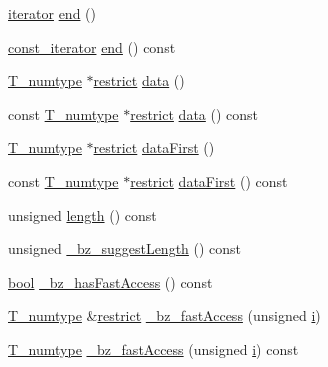 \begin{DoxyCompactItemize}
\item 
\hyperlink{classTinyVector_a7e1e065c0b894add536ab278dfe28202}{iterator} \hyperlink{classTinyVector_affa6a71dd63c4c6d2150bf62dcd23ad1}{end} ()
\item 
\hyperlink{classTinyVector_a58fc9319708794276cdad6399cf03eed}{const\+\_\+iterator} \hyperlink{classTinyVector_a276faa465ad7117075894cb9238a9806}{end} () const 
\item 
\hyperlink{classTinyVector_ab8e7df758dd5a369e92b3cb54a48bdbe}{T\+\_\+numtype} $\ast$\hyperlink{compiler_8h_a080abdcb9c02438f1cd2bb707af25af8}{restrict} \hyperlink{classTinyVector_a949614e43ea6613a98c4aa740011646c}{data} ()
\item 
const \hyperlink{classTinyVector_ab8e7df758dd5a369e92b3cb54a48bdbe}{T\+\_\+numtype} $\ast$\hyperlink{compiler_8h_a080abdcb9c02438f1cd2bb707af25af8}{restrict} \hyperlink{classTinyVector_aaeeb5c4302e27750a01d45565ac4a18d}{data} () const 
\item 
\hyperlink{classTinyVector_ab8e7df758dd5a369e92b3cb54a48bdbe}{T\+\_\+numtype} $\ast$\hyperlink{compiler_8h_a080abdcb9c02438f1cd2bb707af25af8}{restrict} \hyperlink{classTinyVector_a4ef46ae2f363fcdddd2d84b7c3f85ca1}{data\+First} ()
\item 
const \hyperlink{classTinyVector_ab8e7df758dd5a369e92b3cb54a48bdbe}{T\+\_\+numtype} $\ast$\hyperlink{compiler_8h_a080abdcb9c02438f1cd2bb707af25af8}{restrict} \hyperlink{classTinyVector_aa6c883a683a95500d270f0985c06ece3}{data\+First} () const 
\item 
unsigned \hyperlink{classTinyVector_a1ebd93b754246952a79a40c49aa48189}{length} () const 
\item 
unsigned \hyperlink{classTinyVector_aab4c79393a3ce6d92194f0025873c4c9}{\+\_\+bz\+\_\+suggest\+Length} () const 
\item 
\hyperlink{compiler_8h_abb452686968e48b67397da5f97445f5b}{bool} \hyperlink{classTinyVector_a8fc28407c661a712a06f45491712e377}{\+\_\+bz\+\_\+has\+Fast\+Access} () const 
\item 
\hyperlink{classTinyVector_ab8e7df758dd5a369e92b3cb54a48bdbe}{T\+\_\+numtype} \&\hyperlink{compiler_8h_a080abdcb9c02438f1cd2bb707af25af8}{restrict} \hyperlink{classTinyVector_aeed741a4369651e69de924658a66286f}{\+\_\+bz\+\_\+fast\+Access} (unsigned \hyperlink{indexexpr_8h_aabd77643995707c185e95c8cb2782c81}{i})
\item 
\hyperlink{classTinyVector_ab8e7df758dd5a369e92b3cb54a48bdbe}{T\+\_\+numtype} \hyperlink{classTinyVector_a3ea5a8e93b3b320512c69ae1ca2c5733}{\+\_\+bz\+\_\+fast\+Access} (unsigned \hyperlink{indexexpr_8h_aabd77643995707c185e95c8cb2782c81}{i}) const 

\end{DoxyCompactItemize}
